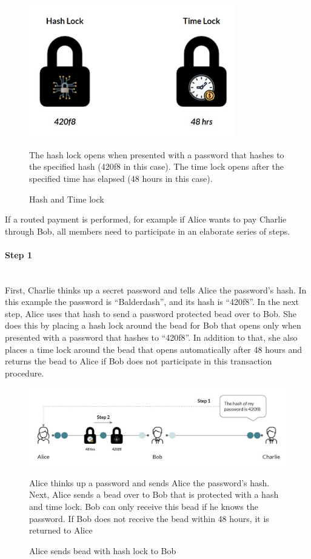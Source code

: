 \documentclass[a4paper, 12pt]{report}
\begin{document}
\begin{figure}[H]
	\centering
	\includegraphics[width=9cm]{08_Locks}
	\caption{Hash and Time lock}
	\medskip
	\small The hash lock opens when presented with a password that hashes to the specified hash (420f8 in this case). The time lock opens after the specified time has elapsed (48 hours in this case).
	\label{fig:08_Locks}
\end{figure}

\par If a routed payment is performed, for example if Alice wants to pay Charlie through Bob, all members need to participate in an elaborate series of steps.

\paragraph{Step 1} \hspace{0pt} \\
First, Charlie thinks up a secret password and tells Alice the password’s hash. In this example the password is “Balderdash”, and its hash is “420f8”. In the next step, Alice uses that hash to send a password protected bead over to Bob. She does this by placing a hash lock around the bead for Bob that opens only when presented with a password that hashes to “420f8”. In addition to that, she also places a time lock around the bead that opens automatically after 48 hours and returns the bead to Alice if Bob does not participate in this transaction procedure.

\begin{figure}[H]
	\includegraphics[width=\textwidth]{09_HTLC_Step1}
	\caption{Alice sends bead with hash lock to Bob}
	\medskip
	\small Alice thinks up a password and sends Alice the password’s hash. Next, Alice sends a bead over to Bob that is protected with a hash and time lock. Bob can only receive this bead if he knows the password. If Bob does not receive the bead within 48 hours, it is returned to Alice
	\label{fig:09_HTLC_Step1}
\end{figure}
\end{document}
